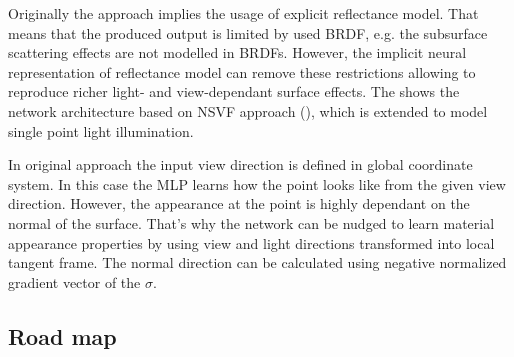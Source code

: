 \documentclass[english]{article}
\begin{document}
Originally the approach implies the usage of explicit reflectance model.
That means that the produced output is limited by used BRDF, e.g. the subsurface scattering effects are not modelled in BRDFs.
However, the implicit neural representation of reflectance model can remove these restrictions allowing to reproduce richer light- and view-dependant surface effects. The  shows the network architecture based on NSVF approach (\cite{nsvf2020}), which is extended to model single point light illumination.

In original approach the input view direction is defined in global coordinate system.
In this case the MLP learns how the point looks like from the given view direction.
However, the appearance at the point is highly dependant on the normal of the surface.
That's why the network can be nudged to learn material appearance properties by using view and light directions transformed into local tangent frame.
The normal direction can be calculated using negative normalized gradient vector of the $\sigma$.


\subsection{Road map}
\label{roadmap}
\end{document}
